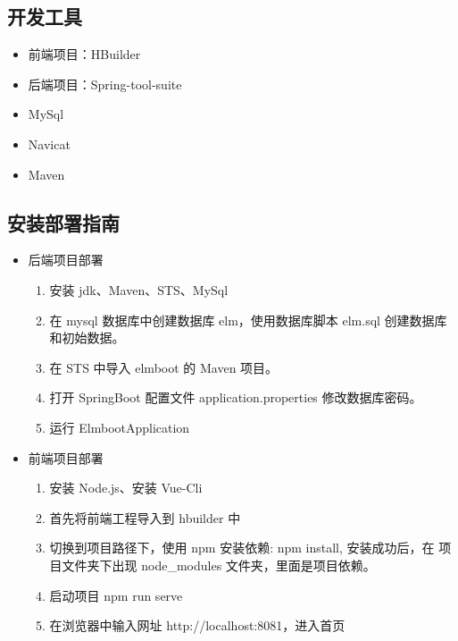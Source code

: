 \subsection{开发工具}
    \begin{itemize}
        \item 前端项目：HBuilder
        \item 后端项目：Spring-tool-suite
        \item MySql
        \item Navicat
        \item Maven
    \end{itemize}

\subsection {安装部署指南}
\begin{itemize}
    \item {后端项目部署}
        \begin{enumerate}
            \item 安装 jdk、Maven、STS、MySql
            \item 在 mysql 数据库中创建数据库 elm，使用数据库脚本 elm.sql 创建数据库和初始数据。
            \item 在 STS 中导入 elmboot 的 Maven 项目。
            \item 打开 SpringBoot 配置文件 application.properties 修改数据库密码。
            \item 运行 ElmbootApplication
        \end{enumerate}
    \item {前端项目部署}
        \begin{enumerate}
            \item 安装 Node.js、安装 Vue-Cli
            \item 首先将前端工程导入到 hbuilder 中
            \item 切换到项目路径下，使用 npm 安装依赖: npm install, 安装成功后，在
            项目文件夹下出现 node\_modules 文件夹，里面是项目依赖。
            \item 启动项目 npm run serve
            \item 在浏览器中输入网址 http://localhost:8081，进入首页
        \end{enumerate}
\end{itemize}
